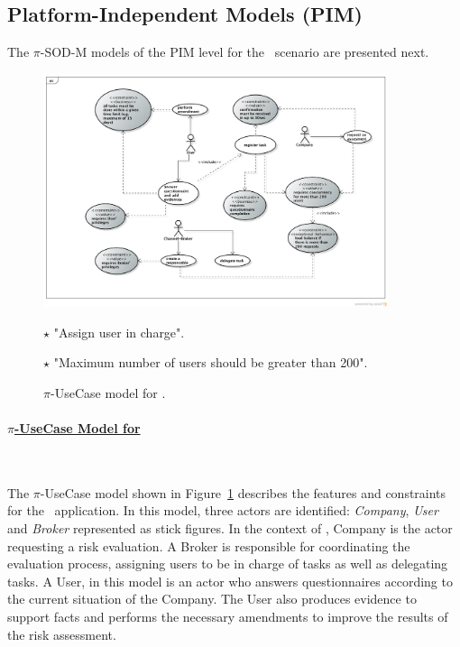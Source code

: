 \subsection{Platform-Independent Models (PIM)}

The $\pi$-SOD-M models of the PIM level  for the \FlyingPig\ scenario are presented next.

\begin{figure}[t]
\centering
\includegraphics[width=0.9\textwidth]{figs/UseCaseGeneral.png}

{\color{red} \raggedright
$\star$  "Assign user in charge".

$\star$ "Maximum number of users should be greater than 200".
}
\caption{$\pi$-UseCase model for \FlyingPig.\label{fig:piUseCaseModel}}
\end{figure}


\paragraph{\underline{$\pi$-UseCase Model for \FlyingPig}}~

The $\pi$-UseCase model shown in Figure~\ref{fig:piUseCaseModel} describes the features and constraints for the \FlyingPig\ application. 
In this model, three actors are identified: \textit{Company}, \textit{User} and \textit {Broker} represented as stick figures.
In the context of \FlyingPig, Company is the actor requesting a risk evaluation.
A Broker is  responsible for coordinating  the evaluation process, assigning users to be in charge of tasks as well as delegating tasks. 
A User, in this model is an actor who answers questionnaires according to the current situation  of the Company.
The User also produces evidence to support facts and performs the necessary amendments to improve the results of the risk assessment.

